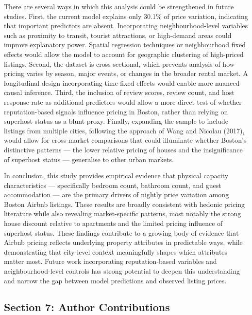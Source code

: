 \documentclass[
]{article}
\begin{document}
There are several ways in which this analysis could be strengthened in
future studies. First, the current model explains only 30.1\% of price
variation, indicating that important predictors are absent.
Incorporating neighbourhood-level variables such as proximity to
transit, tourist attractions, or high-demand areas could improve
explanatory power. Spatial regression techniques or neighbourhood fixed
effects would allow the model to account for geographic clustering of
high-priced listings. Second, the dataset is cross-sectional, which
prevents analysis of how pricing varies by season, major events, or
changes in the broader rental market. A longitudinal design
incorporating time fixed effects would enable more nuanced causal
inference. Third, the inclusion of review scores, review count, and host
response rate as additional predictors would allow a more direct test of
whether reputation-based signals influence pricing in Boston, rather
than relying on superhost status as a blunt proxy. Finally, expanding
the sample to include listings from multiple cities, following the
approach of Wang and Nicolau (2017), would allow for cross-market
comparisons that could illuminate whether Boston's distinctive patterns
--- the lower relative pricing of houses and the insignificance of
superhost status --- generalise to other urban markets.

In conclusion, this study provides empirical evidence that physical
capacity characteristics --- specifically bedroom count, bathroom count,
and guest accommodation --- are the primary drivers of nightly price
variation among Boston Airbnb listings. These results are broadly
consistent with hedonic pricing literature while also revealing
market-specific patterns, most notably the strong house discount
relative to apartments and the limited pricing influence of superhost
status. These findings contribute to a growing body of evidence that
Airbnb pricing reflects underlying property attributes in predictable
ways, while demonstrating that city-level context meaningfully shapes
which attributes matter most. Future work incorporating reputation-based
variables and neighbourhood-level controls has strong potential to
deepen this understanding and narrow the gap between model predictions
and observed listing prices.

\subsection{Section 7: Author
Contributions}\label{section-7-author-contributions}
\end{document}
